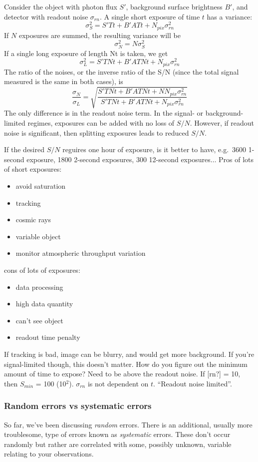\documentclass[12pt]{article}
\begin{document}
Consider the object with photon flux $S'$,
background surface brightness $B'$, and detector
with readout noise $\sigma_{rn}$. A single short exposure of
time $t$ has a variance:
    $$ \sigma_S^2 = S'Tt + B'ATt + N_{pix}\sigma_{rn}^2 $$
If $N$ exposures are summed, the resulting variance will be
    $$ \sigma_N^2 = N\sigma_S^2 $$
If a single long exposure of length Nt is taken, we get
    $$ \sigma_L^2 = S'TNt + B'ATNt + N_{pix}\sigma_{rn}^2 $$
The ratio of the noises, or the inverse ratio of the S/N (since the
total signal measured is the same in both cases), is
    $$ \frac{\sigma_N}{\sigma_L} = \sqrt{\frac
    {S'TNt + B'ATNt + NN_{pix}\sigma_{rn}^2 }
    {S'TNt + B'ATNt + N_{pix}\sigma_{rn}^2}
    }$$
The only difference is in the readout noise term.
In the signal- or background-limited regimes, exposures can be added
with no loss of $S/N$. However, if readout noise is significant, then
splitting exposures leads to reduced $S/N$.

\textcolor{myBlue}{If the desired $S/N$ reguires one hour of exposure,
    is it better to have, e.g.\ 3600 1-second exposure, 1800 2-second
    exposures, 300 12-second exposures$\ldots$
    Pros of lots of short exposures:
    \begin{itemize}
        \item avoid saturation
        \item tracking
        \item cosmic rays
        \item variable object
        \item monitor atmospheric throughput variation
    \end{itemize}
    cons of lots of exposures:
    \begin{itemize}
        \item data processing
        \item high data quantity
        \item can't see object
        \item readout time penalty
    \end{itemize}
    If tracking is bad, image can be blurry, and would get more background.
    If you're signal-limited though, this doesn't matter.
    How do you figure out the minimum amount of time to expose?
    Need to be above the readout noise. If [rn?] = 10, then
    $S_{min}$ = 100 (10$^2$). $\sigma_{rn}$ is not dependent on $t$.
    ``Readout noise limited''.
}

\subsubsection*{Random errors vs systematic errors}
So far, we've been discussing \emph{random} errors.
There is an additional,
usually more troublesome, type of errors known as \emph{systematic} errors.
These don't occur randomly but rather are correlated with some,
possibly unknown, variable relating to your observations.
\end{document}
